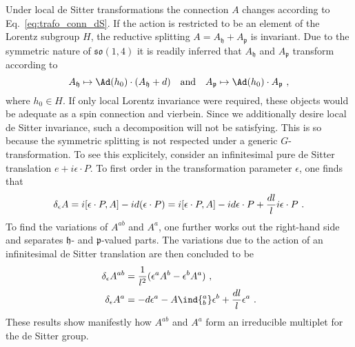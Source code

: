 \documentclass[11pt]{article}
\begin{document}
\blankline
Under local de Sitter transformations the connection $A$ changes 
according to Eq.~\eqref{eq:trafo_conn_dS}. If the action is 
restricted to be an element of the Lorentz subgroup $H$, the 
reductive splitting $A = A_\mathfrak{h} + A_\mathfrak{p}$ is 
invariant. Due to the symmetric nature of $\mathfrak{so}(1,4)$ it
is readily inferred that $A_\mathfrak{h}$ and $A_\mathfrak{p}$ 
transform according to
\begin{displaymath}
	A_\mathfrak{h} \mapsto \Ad(h_0) \cdot (A_\mathfrak{h} + d)
	\quad	\text{and} \quad
	A_\mathfrak{p} \mapsto \Ad(h_0) \cdot A_\mathfrak{p}~,
\end{displaymath}
where $h_0 \in H$.
If only local Lorentz invariance were required, these objects 
would be adequate as a spin connection and vierbein.  Since we 
additionally desire local de Sitter invariance, such a 
decomposition will not be satisfying. This is so because the 
symmetric splitting is not respected under a generic 
$G$-transformation. To see this explicitely, consider an 
infinitesimal pure de Sitter translation $e + i \epsilon\cdot P$.
To first order in the transformation parameter $\epsilon$, one 
finds that
\begin{displaymath}
	\delta_\epsilon A
		= i[\epsilon\cdot P,A] -i d(\epsilon\cdot P) \\
		= i[\epsilon\cdot P,A] -i d\epsilon\cdot P + \frac{dl}{l} i 
		\epsilon\cdot P~.
\end{displaymath}
To find the variations of $A^{ab}$ and $A^a$, one further works 
out the right-hand side and separates $\mathfrak{h}$- and 
$\mathfrak{p}$-valued parts. The variations due to the action of 
an infinitesimal de Sitter translation are then concluded to be
\begin{subequations}
	\label{eqs:var_lin_Ah_Ap}
\begin{align}
	\delta_\epsilon A^{ab} &= \frac{1}{l^2}(\epsilon^a A^b - 
	\epsilon^b A^a)~, \\
	\delta_\epsilon A^a &= -d\epsilon^a - A\ind{^a_b}\epsilon^b + 
	\frac{dl}{l}\epsilon^a~.
\end{align}
\end{subequations}
These results show manifestly how $A^{ab}$ and $A^a$ form an 
irreducible multiplet for the de Sitter group.
\end{document}

